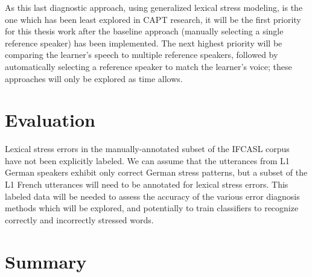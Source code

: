 As this last diagnostic approach, using generalized lexical stress modeling, is the one which has been least explored in CAPT research, it will be the first priority for this thesis work after the baseline approach (manually selecting a single reference speaker) has been implemented. The next highest priority will be comparing the learner's speech to multiple reference speakers, followed by automatically selecting a reference speaker to match the learner's voice; these approaches will only be explored as time allows.

\section{Evaluation}
\label{sec:diag:eval}

Lexical stress errors in the manually-annotated subset of the IFCASL corpus have not been explicitly labeled. We can assume that the utterances from L1 German speakers exhibit only correct German stress patterns, but a subset of the L1 French utterances will need to be annotated for lexical stress errors. This labeled data will be needed to assess the accuracy of the various error diagnosis methods which will be explored, and potentially to train classifiers to recognize correctly and incorrectly stressed words. 

%

\section{Summary}
\label{sec:diag:summary}